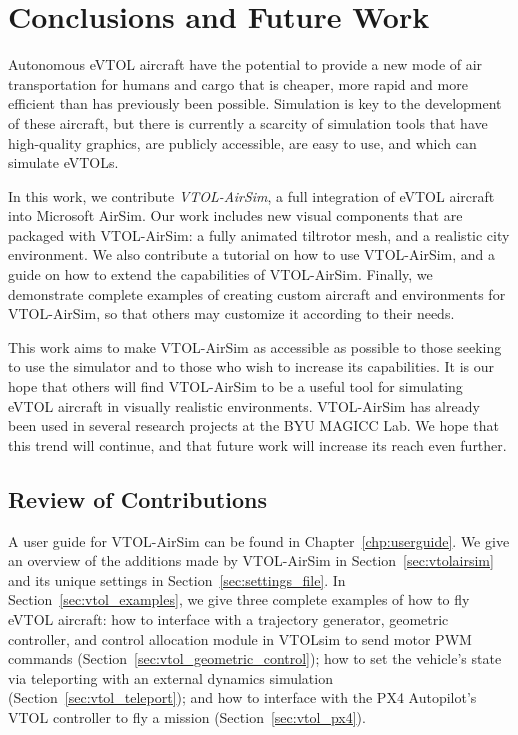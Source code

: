 
\chapter{Conclusions and Future Work}\label{chp:conclusion}

Autonomous eVTOL aircraft have the potential to provide a new mode of air transportation for humans and cargo that is cheaper, more rapid and more efficient than has previously been possible. Simulation is key to the development of these aircraft, but there is currently a scarcity of simulation tools that have high-quality graphics, are publicly accessible, are easy to use, and which can simulate eVTOLs.

In this work, we contribute \textit{VTOL-AirSim}, a full integration of eVTOL aircraft into Microsoft AirSim. Our work includes new visual components that are packaged with VTOL-AirSim: a fully animated tiltrotor mesh, and a realistic city environment. We also contribute a tutorial on how to use VTOL-AirSim, and a guide on how to extend the capabilities of VTOL-AirSim. Finally, we demonstrate complete examples of creating custom aircraft and environments for VTOL-AirSim, so that others may customize it according to their needs.

This work aims to make VTOL-AirSim as accessible as possible to those seeking to use the simulator and to those who wish to increase its capabilities. It is our hope that others will find VTOL-AirSim to be a useful tool for simulating eVTOL aircraft in visually realistic environments. VTOL-AirSim has already been used in several research projects at the BYU MAGICC Lab. We hope that this trend will continue, and that future work will increase its reach even further.

\section{Review of Contributions}

A user guide for VTOL-AirSim can be found in Chapter~\ref{chp:userguide}. We give an overview of the additions made by VTOL-AirSim in Section~\ref{sec:vtolairsim} and its unique settings in Section~\ref{sec:settings_file}. In Section~\ref{sec:vtol_examples}, we give three complete examples of how to fly eVTOL aircraft: how to interface with a trajectory generator, geometric controller, and control allocation module in VTOLsim to send motor PWM commands (Section~\ref{sec:vtol_geometric_control}); how to set the vehicle's state via teleporting with an external dynamics simulation (Section~\ref{sec:vtol_teleport}); and how to interface with the PX4 Autopilot's VTOL controller to fly a mission (Section~\ref{sec:vtol_px4}).

